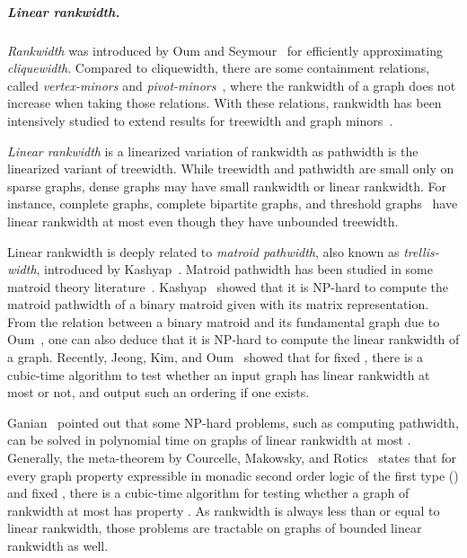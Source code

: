 \documentclass[11pt]{article}
\theoremstyle{remark}
\begin{document}
\subparagraph{Linear rankwidth.} 
\emph{Rankwidth} was introduced by Oum and Seymour~\cite{OS2004} for efficiently approximating \emph{cliquewidth}. 
Compared to cliquewidth, there are some containment relations, called \emph{vertex-minors} and \emph{pivot-minors}~\cite{Oum05}, 
where the rankwidth of a graph does not increase when taking those relations.
With these relations, 
rankwidth has been intensively studied to extend  results for treewidth and graph minors~\cite{AKK2014, CourcelleK09,GanianH10,JKO2014, Kante2012, Oum05, Oum2006, OS2004}.

\emph{Linear rankwidth} is a linearized variation of rankwidth as pathwidth is the linearized variant of treewidth. While treewidth and pathwidth are small only on sparse graphs, dense graphs may have small rankwidth or linear rankwidth. For instance, complete graphs, complete bipartite graphs, and threshold graphs~\cite{ChvatalH1977} have linear rankwidth at most  even though they  have unbounded treewidth. 

Linear rankwidth is deeply related to \emph{matroid pathwidth}, also known as \emph{trellis-width}, introduced by Kashyap~\cite{Kashyap08}.
Matroid pathwidth has been studied in some matroid theory literature~\cite{GeelenGW2006, HallOS2007, KoutsonasTY2014}. 
Kashyap~\cite{Kashyap08} showed that it is NP-hard to compute the matroid pathwidth of a binary matroid given with its matrix representation.
From the relation between a binary matroid and its fundamental graph due to Oum~\cite{Oum05},  
one can also deduce that it is NP-hard to compute the linear rankwidth of a graph.
Recently, 
Jeong, Kim, and Oum~\cite{JeongKO2016} showed that for fixed , there is a cubic-time algorithm to test whether an input graph has linear rankwidth at most  or not, and 
output such an ordering if one exists.




Ganian~\cite{Ganian10} pointed out that some NP-hard problems, such as computing pathwidth, can be solved in polynomial time on graphs of linear rankwidth at most .
Generally, the meta-theorem by Courcelle, Makowsky, and Rotics~\cite{CourcelleMR00} states that for every graph property  expressible in monadic second order logic of the first type () and fixed , there is a cubic-time algorithm for testing whether a graph of rankwidth at most  has property .
As rankwidth is always less than or equal to linear rankwidth, 
those problems are tractable on graphs of bounded linear rankwidth as well.
\end{document}
